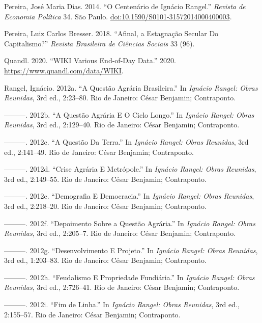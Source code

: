\documentclass[
	12pt,				%
	oneside,			%
	a4paper,			%
	chapter=TITLE,		%
	section=TITLE,		%
	english,			%
	brazil				%
	]{abntex2}
\begin{document}
\leavevmode\hypertarget{ref-pereira}{}%
Pereira, José Maria Dias. 2014. ``O Centenário de Ignácio Rangel.'' \emph{Revista de Economia Política} 34. São Paulo. \url{doi:10.1590/S0101-31572014000400003}.

\leavevmode\hypertarget{ref-bresser2018}{}%
Pereira, Luiz Carlos Bresser. 2018. ``Afinal, a Estagnação Secular Do Capitalismo?'' \emph{Revista Brasileira de Ciências Sociais} 33 (96).

\leavevmode\hypertarget{ref-QuandlWIKI}{}%
Quandl. 2020. ``WIKI Various End-of-Day Data.'' 2020. \url{https://www.quandl.com/data/WIKI}.

\leavevmode\hypertarget{ref-rangel1962}{}%
Rangel, Ignácio. 2012a. ``A Questão Agrária Brasileira.'' In \emph{Ignácio Rangel: Obras Reunidas}, 3rd ed., 2:23--80. Rio de Janeiro: César Benjamin; Contraponto.

\leavevmode\hypertarget{ref-rangel1986b}{}%
---------. 2012b. ``A Questão Agrária E O Ciclo Longo.'' In \emph{Ignácio Rangel: Obras Reunidas}, 3rd ed., 2:129--40. Rio de Janeiro: César Benjamin; Contraponto.

\leavevmode\hypertarget{ref-rangel1986c}{}%
---------. 2012c. ``A Questão Da Terra.'' In \emph{Ignácio Rangel: Obras Reunidas}, 3rd ed., 2:141--49. Rio de Janeiro: César Benjamin; Contraponto.

\leavevmode\hypertarget{ref-rangel1986a}{}%
---------. 2012d. ``Crise Agrária E Metrópole.'' In \emph{Ignácio Rangel: Obras Reunidas}, 3rd ed., 2:149--55. Rio de Janeiro: César Benjamin; Contraponto.

\leavevmode\hypertarget{ref-rangel1961}{}%
---------. 2012e. ``Demografia E Democracia.'' In \emph{Ignácio Rangel: Obras Reunidas}, 3rd ed., 2:218--20. Rio de Janeiro: César Benjamin; Contraponto.

\leavevmode\hypertarget{ref-rangel1960}{}%
---------. 2012f. ``Depoimento Sobre a Questão Agrária.'' In \emph{Ignácio Rangel: Obras Reunidas}, 3rd ed., 2:205--7. Rio de Janeiro: César Benjamin; Contraponto.

\leavevmode\hypertarget{ref-rangel1956}{}%
---------. 2012g. ``Desenvolvimento E Projeto.'' In \emph{Ignácio Rangel: Obras Reunidas}, 3rd ed., 1:203--83. Rio de Janeiro: César Benjamin; Contraponto.

\leavevmode\hypertarget{ref-rangel1989}{}%
---------. 2012h. ``Feudalismo E Propriedade Fundiária.'' In \emph{Ignácio Rangel: Obras Reunidas}, 3rd ed., 2:726--41. Rio de Janeiro: César Benjamin; Contraponto.

\leavevmode\hypertarget{ref-rangel1988}{}%
---------. 2012i. ``Fim de Linha.'' In \emph{Ignácio Rangel: Obras Reunidas}, 3rd ed., 2:155--57. Rio de Janeiro: César Benjamin; Contraponto.
\end{document}
